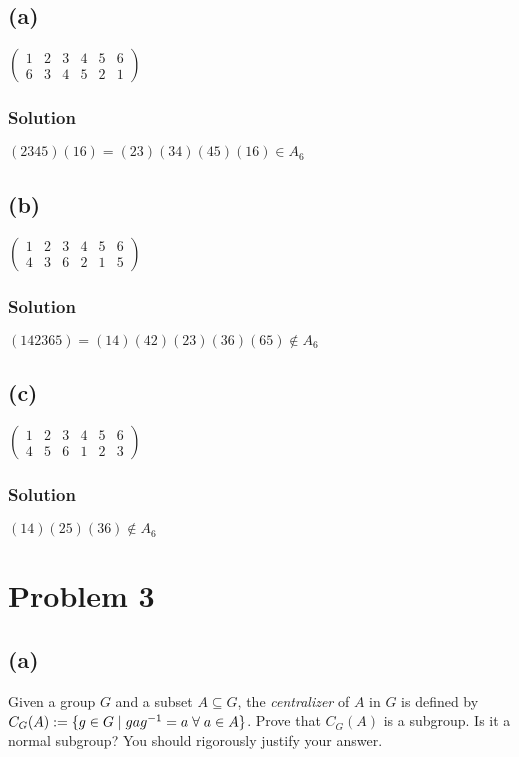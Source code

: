 \documentclass[fleqn]{article}
\begin{document}
        \subsection{(a)}
        $\begin{pmatrix}
            1 & 2 & 3 & 4 & 5 & 6 \\
            6 & 3 & 4 & 5 & 2 & 1
        \end{pmatrix}$
            
            \subsubsection{Solution}
            $(2345)(16) = (23)(34)(45)(16) \in A_6$
        
        \subsection{(b)}
        $\begin{pmatrix}
            1 & 2 & 3 & 4 & 5 & 6 \\
            4 & 3 & 6 & 2 & 1 & 5
        \end{pmatrix}$
            
            \subsubsection{Solution}
            $(142365) = (14)(42)(23)(36)(65) \notin A_6$
        
        \subsection{(c)}
        $\begin{pmatrix}
            1 & 2 & 3 & 4 & 5 & 6 \\
            4 & 5 & 6 & 1 & 2 & 3
        \end{pmatrix}$
            
            \subsubsection{Solution}
            $(14)(25)(36) \notin A_6$
    
    \section{Problem 3}
        
        \subsection{(a)}
        Given a group $G$ and a subset $A \subseteq G$, the \textit{centralizer} of $A$ in $G$ is defined by $C_G(A) := \{g \in G \mid gag^{-1} = a \thickspace \forall \thickspace a \in A\}$.  Prove that $C_G(A)$ is a subgroup.  Is it a normal subgroup?  You should rigorously justify your answer.
            
\end{document}

